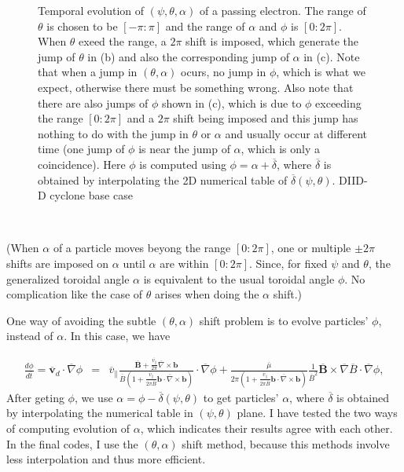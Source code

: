 \documentclass{article}
\begin{document}
\begin{figure}[h]
  \caption{\label{18-2-4-p1}Temporal evolution of $(\psi, \theta, \alpha)$ of
  a passing electron. The range of $\theta$ is chosen to be $[- \pi : \pi]$
  and the range of $\alpha$ and $\phi$ is $[0 : 2 \pi]$. When $\theta$ exeed
  the range, a $2 \pi$ shift is imposed, which generate the jump of $\theta$
  in (b) and also the corresponding jump of $\alpha$ in (c). Note that when a
  jump in $(\theta, \alpha)$ ocurs, no jump in $\phi$, which is what we
  expect, otherwise there must be something wrong. Also note that there are
  also jumps of $\phi$ shown in (c), which is due to $\phi$ exceeding the
  range $[0 : 2 \pi]$ and a $2 \pi$ shift being imposed and this jump has
  nothing to do with the jump in $\theta$ or $\alpha$ and usually occur at
  different time (one jump of $\phi$ is near the jump of $\alpha$, which is
  only a coincidence). Here $\phi$ is computed using $\phi = \alpha +
  \overline{\delta}$, where $\overline{\delta}$ is obtained by interpolating
  the 2D numerical table of $\overline{\delta} (\psi, \theta)$. DIID-D cyclone
  base case}
\end{figure}

\

(When $\alpha$ of a particle moves beyong the range $[0 : 2 \pi]$, one or
multiple $\pm 2 \pi$ shifts are imposed on $\alpha$ until $\alpha$ are within
$[0 : 2 \pi]$. Since, for fixed $\psi$ and $\theta$, the generalized toroidal
angle $\alpha$ is equivalent to the usual toroidal angle $\phi$. No
complication like the case of $\theta$ arises when doing the $\alpha$ shift.)

One way of avoiding the subtle $(\theta, \alpha)$ shift problem is to evolve
particles' $\phi$, instead of $\alpha$. In this case, we have


\begin{eqnarray}
  \frac{d \phi}{d \overline{t}} = \overline{\mathbf{v}}_d \cdot
  \overline{\nabla} \phi & = & \overline{v}_{\parallel}
  \frac{\overline{\mathbf{B}} + \frac{\overline{v_{\parallel}}}{2 \pi}
  \overline{\nabla} \times \mathbf{b}}{\overline{B} \left( 1 +
  \frac{\overline{v}_{\parallel}}{2 \pi \overline{B}} \mathbf{b} \cdot
  \overline{\nabla} \times \mathbf{b} \right)} \cdot \overline{\nabla} \phi +
  \frac{\overline{\mu}}{2 \pi \left( 1 + \frac{\overline{v}_{\parallel}}{2 \pi
  \overline{B}} \mathbf{b} \cdot \overline{\nabla} \times \mathbf{b} \right)}
  \frac{1}{\overline{B}^2} \overline{\mathbf{B}} \times \overline{\nabla}
  \overline{B} \cdot \overline{\nabla} \phi, 
\end{eqnarray}
After geting $\phi$, we use $\alpha = \phi - \overline{\delta} (\psi, \theta)$
to get particles' $\alpha$, where $\overline{\delta}$ is obtained by
interpolating the numerical table in $(\psi, \theta)$ plane. I have tested the
two ways of computing evolution of $\alpha$, which indicates their results
agree with each other. In the final codes, I use the $(\theta, \alpha)$ shift
method, because this methods involve less interpolation and thus more
efficient.
\end{document}
